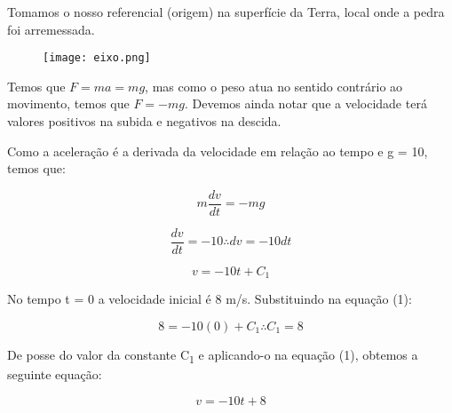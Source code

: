 \documentclass{beamer}
\begin{document}
	\begin{frame}
		Tomamos o nosso referencial (origem) na superfície da Terra, local onde a pedra foi arremessada.
		\begin{figure}
			\centering
			\texttt{[image: eixo.png]}
			\label{}
		\end{figure}
		
		Temos que \(F = ma = mg\), mas como o peso atua no sentido contrário ao movimento, temos que \(F = -mg\). Devemos ainda notar que a velocidade terá valores positivos na subida e negativos na descida.
	\end{frame}
	 
	\begin{frame}
		Como a aceleração é a derivada da velocidade em relação ao tempo e g = 10, temos que: \pause
		
		\begin{displaymath}
			m\frac{dv}{dt} = -mg
		\end{displaymath}
		
		\begin{displaymath}
			\frac{dv}{dt} = -10 \therefore dv = -10 dt 
		\end{displaymath}
		
		\begin{equation}
			v = -10t + C_1
		\end{equation} \pause
		
		No tempo t = 0 a velocidade inicial é 8 m/s. Substituindo na equação (1):
		
		\begin{displaymath}
			8 = -10(0) + C_1 \therefore C_1= 8
		\end{displaymath} \pause
		
		De posse do valor da constante C\textsubscript{1} e aplicando-o na equação (1), obtemos a seguinte equação:
		
		\begin{equation}
			\boxed{ v = -10t + 8}
		\end{equation}
	\end{frame}
	
\end{document}
